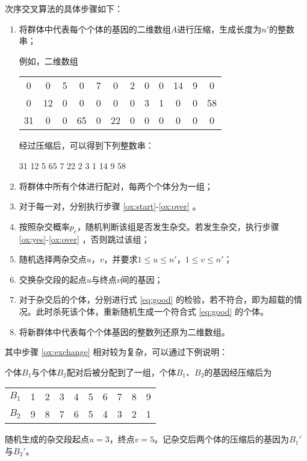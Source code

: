 \documentclass[UTF8,cs4size]{ctexart}
\begin{document}
次序交叉算法的具体步骤如下：
\begin{enumerate}
\item 将群体中代表每个个体的基因的二维数组$A$进行压缩，生成长度为$n'$的整数串；

例如，二维数组
\begin{center}
\begin{tabular}{cccccccccccc}
0 & 0 & 5 & 0 & 7 & 0 & 2 & 0 & 0 & 14 & 9 & 0 \\
0 & 12 & 0 & 0 & 0 & 0 & 0 & 3 & 1 & 0 & 0 & 58 \\
31 & 0 & 0 & 65 & 0 & 22 & 0 & 0 & 0 & 0 & 0 & 0 \\
\end{tabular}
\end{center}
经过压缩后，可以得到下列整数串：
\begin{center}
31 12 5 65 7 22 2 3 1 14 9 58
\end{center}
\item 将群体中所有个体进行配对，每两个个体分为一组；
\item 对于每一对，分别执行步骤 \ref{ox:start}-\ref{ox:over} 。
\item 按照杂交概率$p_c$，随机判断该组是否发生杂交。若发生杂交，执行步骤 \ref{ox:yes}-\ref{ox:over} ，否则跳过该组；\label{ox:start}
\item 随机选择两杂交点$u$，$v$，并要求$1 \leq u \leq n'$，$1 \leq v \leq n'$；\label{ox:yes}
\item 交换杂交段的起点$u$与终点$v$间的基因；\label{ox:exchange}
\item 对于杂交后的个体，分别进行式 \ref{eq:good} 的检验，若不符合，即为超载的情况。此时杀死该个体，重新随机生成一个符合式 \ref{eq:good} 的个体。\label{ox:over}
\item 将新群体中代表每个个体基因的整数列还原为二维数组。
\end{enumerate}
其中步骤 \ref{ox:exchange} 相对较为复杂，可以通过下例说明：

个体$B_1$与个体$B_2$配对后被分配到了一组，个体$B_1$、$B_2$的基因经压缩后为
\begin{center}
\begin{tabular}{c|ccccccccc}
$B_1$ & 1 & 2 & 3 & 4 & 5 & 6 & 7 & 8 & 9 \\
$B_2$ & 9 & 8 & 7 & 6 & 5 & 4 & 3 & 2 & 1 
\end{tabular}
\end{center}
随机生成的杂交段起点$u=3$，终点$v=5$。记杂交后两个体的压缩后的基因为$B_1'$与$B_2'$。
\end{document}
